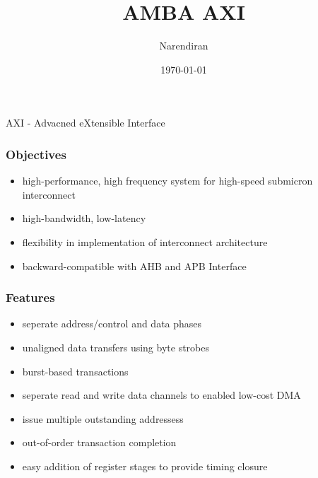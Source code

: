 \documentclass{article}
\title{AMBA AXI}
\author{Narendiran}
\date{\today}
\begin{document}
\large
    \maketitle

\quad AXI - Advacned eXtensible Interface
\subsubsection{Objectives}
\begin{itemize}
    \item high-performance, high frequency system for high-speed submicron interconnect
    \item high-bandwidth, low-latency
    \item flexibility in implementation of interconnect architecture
    \item backward-compatible with AHB and APB Interface
\end{itemize}
\subsubsection{Features}
\begin{itemize}
    \item seperate address/control and data phases
    \item unaligned data transfers using byte strobes
    \item burst-based transactions
    \item seperate read and write data channels to enabled low-cost DMA
    \item issue multiple outstanding addressess
    \item out-of-order transaction completion
    \item easy addition of register stages to provide timing closure
\end{itemize}
\end{document}
